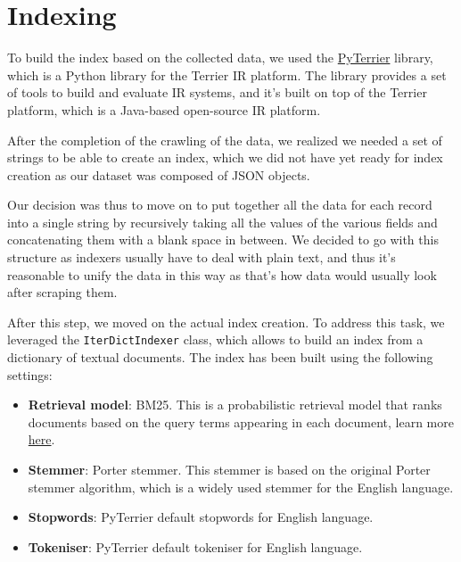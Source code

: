 \section{Indexing}

To build the index based on the collected data, we used the \href{https://github.com/terrier-org/pyterrier}{PyTerrier} library, which is a Python library for the Terrier IR platform. The library provides a set of tools to build and evaluate IR systems, and it's built on top of the Terrier platform, which is a Java-based open-source IR platform.

After the completion of the crawling of the data, we realized we needed a set of strings to be able to create an index, which we did not have yet ready for index creation as our dataset was composed of JSON objects.

Our decision was thus to move on to put together all the data for each record into a single string by recursively taking all the values of the various fields and concatenating them with a blank space in between. We decided to go with this structure as indexers usually have to deal with plain text, and thus it's reasonable to unify the data in this way as that's how data would usually look after scraping them.

After this step, we moved on the actual index creation. To address this task, we leveraged the \texttt{IterDictIndexer} class, which allows to build an index from a dictionary of textual documents. The index has been built using the following settings:

\begin{itemize}
  \item \textbf{Retrieval model}: BM25. This is a probabilistic retrieval model that ranks documents based on the query terms appearing in each document, learn more \href{https://en.wikipedia.org/wiki/Okapi_BM25}{here}.
  \item \textbf{Stemmer}: Porter stemmer. This stemmer is based on the original Porter stemmer algorithm, which is a widely used stemmer for the English language.
  \item \textbf{Stopwords}: PyTerrier default stopwords for English language.
  \item \textbf{Tokeniser}: PyTerrier default tokeniser for English language.
\end{itemize}
